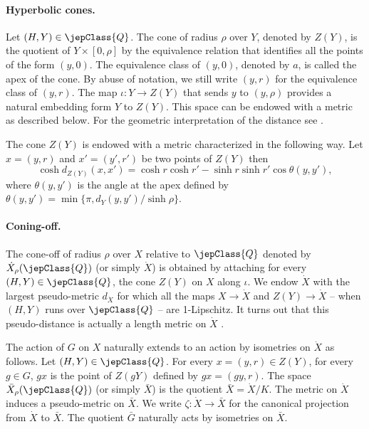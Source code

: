 \paragraph*{Hyperbolic cones.}
Let $(H,Y)\in\jepClass{Q}$. The cone of radius $\rho$ over $Y$, denoted by $Z(Y)$, is the quotient of $Y\times[0,\rho]$ by the equivalence relation that identifies all the points of the form $(y,0)$. The equivalence class of $(y,0)$, denoted by $a$, is called the apex of the cone. By abuse of notation, we still write $(y,r)$ for the equivalence class of $(y,r)$. The map $\iota:Y\to Z(Y)$ that sends $y$ to $(y,\rho)$ provides a natural embedding form $Y$ to $Z(Y)$. This space can be endowed with a metric as described below. For the geometric interpretation of the distance see \cite[\S4.1]{ref06}.
\begin{proposition}\label{prop:cone}
The cone $Z(Y)$ is endowed with a metric characterized in the following way. Let $x=(y,r)$ and $x'=(y',r')$ be two points of $Z(Y)$ then
\[
\cosh d_{Z(Y)}(x,x')=\cosh r\cosh r'-\sinh r\sinh r'\cos\theta(y,y'),
\]
where $\theta(y,y')$ is the angle at the apex defined by $\theta(y,y')=\min\{\pi,d_Y(y,y')/\sinh\rho\}$.
\end{proposition}

\paragraph*{Coning-off.}
The cone-off of radius $\rho$ over $X$ relative to $\jepClass{Q}$ denoted by $\dot X_\rho(\jepClass{Q})$ (or simply $\dot X$) is obtained by attaching for every $(H,Y)\in\jepClass{Q}$, the cone $Z(Y)$ on $X$ along $\iota$. We endow $\dot X$ with the largest pseudo-metric $d_{\dot X}$ for which all the maps $X\to\dot X$ and $Z(Y)\to\dot X$ -- when $(H,Y)$ runs over $\jepClass{Q}$ -- are 1-Lipschitz. It turns out that this pseudo-distance is actually a length metric on $\dot X$ \cite[Prop.\,5.10]{ref06}.

The action of $G$ on $X$ naturally extends to an action by isometries on $\dot X$ as follows. Let $(H,Y)\in\jepClass{Q}$. For every $x=(y,r)\in Z(Y)$, for every $g\in G$, $gx$ is the point of $Z(gY)$ defined by $gx=(gy,r)$. The space $\bar X_\rho(\jepClass{Q})$ (or simply $\bar X$) is the quotient $\bar X=\dot X/K$. The metric on $\dot X$ induces a pseudo-metric on $\bar X$. We write $\zeta:\dot X\to\bar X$ for the canonical projection from $\dot X$ to $\bar X$. The quotient $\bar G$ naturally acts by isometries on $\bar X$.

